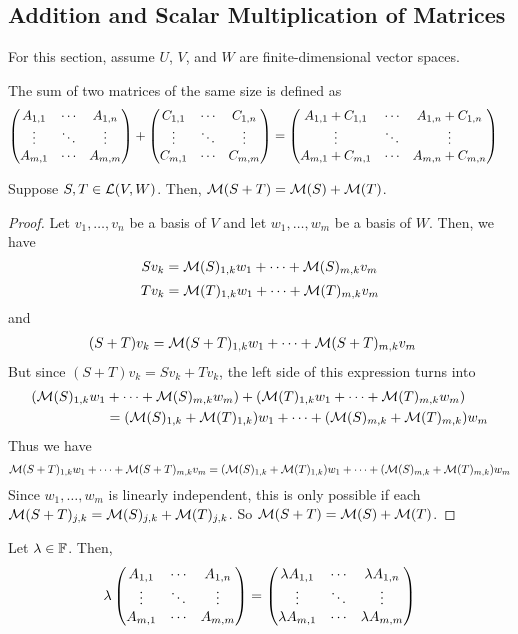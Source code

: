 \subsection*{Addition and Scalar Multiplication of Matrices}
For this section, assume $U$, $V$, and $W$ are finite-dimensional vector spaces. 
\begin{definition}
    The sum of two matrices of the same size is defined as
    \begin{align*}
        \amat{A}{m}{n} + \amat{C}{m}{n} &= \pmat{A_{1,1}+C_{1,1} & \cdots & A_{1,n}+C_{1,n} \\
        \vdots & \ddots & \vdots \\
        A_{m,1}+C_{m,1} & \cdots & A_{m,n} + C_{m,n}}
    \end{align*}
\end{definition}
\begin{theorem}
    Suppose $S,T\in\lmap(V,W)$. Then, $\matr(S+T) = \matr(S) + \matr(T)$.
\end{theorem}
\begin{proof}
    Let $v_1, \dots, v_n$ be a basis of $V$ and let $w_1, \dots, w_m$ be a basis of $W$. Then, we have
    \[ Sv_k = \matr(S)_{1,k}w_1 + \cdots + \matr(S)_{m,k}v_m \]
    \[ Tv_k = \matr(T)_{1,k}w_1 + \cdots + \matr(T)_{m,k}v_m \]
    and
    \begin{align*}
        (S+T)v_k &= \matr(S+T)_{1,k}w_1 + \cdots + \matr(S+T)_{m,k}v_m
    \end{align*}
    But since $(S+T)v_k = Sv_k + Tv_k$, the left side of this expression turns into
    \begin{align*}
        (\matr(S)_{1,k}w_1 &+ \cdots + \matr(S)_{m,k}w_m) + (\matr(T)_{1,k}w_1 + \cdots + \matr(T)_{m,k}w_m) \\
        &= (\matr(S)_{1,k}+\matr(T)_{1,k})w_1 + \cdots + (\matr(S)_{m,k}+\matr(T)_{m,k})w_m
    \end{align*}
    Thus we have 
    \[ \matr(S+T)_{1,k}w_1 + \cdots + \matr(S+T)_{m,k}v_m = (\matr(S)_{1,k}+\matr(T)_{1,k})w_1 + \cdots + (\matr(S)_{m,k}+\matr(T)_{m,k})w_m \]
    Since $w_1, \dots, w_m$ is linearly independent, this is only possible if each $\matr(S+T)_{j,k} = \matr(S)_{j,k} + \matr(T)_{j,k}$. So $\matr(S+T) = \matr(S)+\matr(T)$.
\end{proof}
\begin{definition}
    Let $\lambda\in\F$. Then,
    \begin{align*}
        \lambda \amat{A}{m}{n} = \amat{\lambda A}{m}{n}
    \end{align*}
\end{definition}
